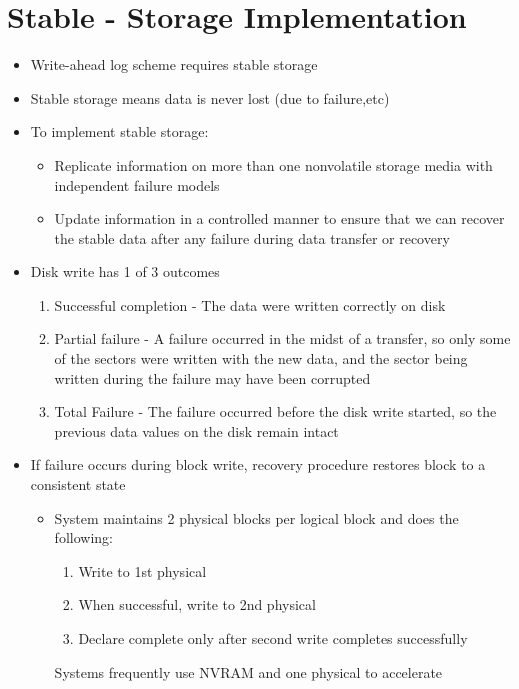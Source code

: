 \documentclass{article}[18pt]
\begin{document}
\section{Stable - Storage Implementation}
\begin{itemize}
	\item Write-ahead log scheme requires stable storage
	\item Stable storage means data is never lost (due to failure,etc)
	\item To implement stable storage:
	\begin{itemize}
		\item Replicate information on more than one nonvolatile storage media with independent failure models
		\item Update information in a controlled manner to ensure that we can recover the stable data after any failure during data transfer or recovery
	\end{itemize}
	\item Disk write has 1 of 3 outcomes
	\begin{enumerate}
		\item Successful completion - The data were written correctly on disk
		\item Partial failure - A failure occurred in the midst of a transfer, so only some of the sectors were written with the new data, and the sector being written during the failure may have been corrupted
		\item Total Failure - The failure occurred before the disk write started, so the previous data values on the disk remain intact
	\end{enumerate}
	\item If failure occurs during block write, recovery procedure restores block to a consistent state
	\begin{itemize}
		\item System maintains 2 physical blocks per logical block and does the following:
		\begin{enumerate}
			\item Write to 1st physical
			\item When successful, write to 2nd physical
			\item Declare complete only after second write completes successfully
		\end{enumerate}
		Systems frequently use NVRAM and one physical to accelerate
	\end{itemize}
\end{itemize}
\end{document}

